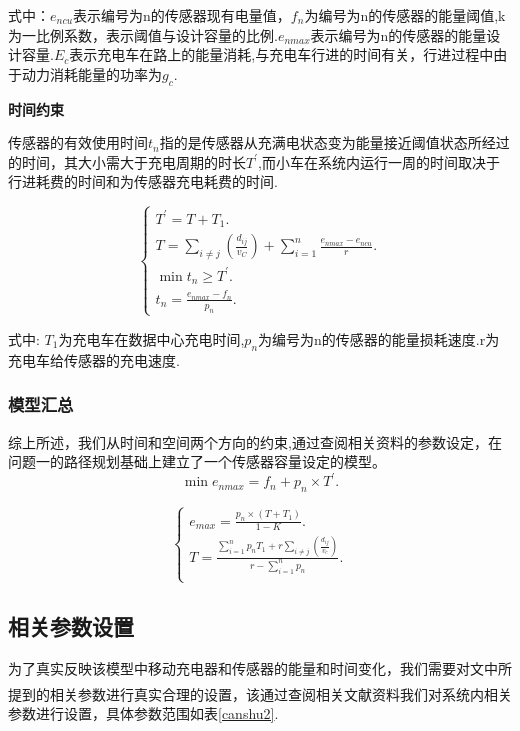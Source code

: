 \documentclass{whutmod}
\newcommand{\upcite}[1]{\textsuperscript{\textsuperscript{\cite{#1}}}}
\begin{document}
式中：$e_{ncu}$表示编号为n的传感器现有电量值，$f_{n}$为编号为n的传感器的能量阈值,k为一比例系数，表示阈值与设计容量的比例.$e_{nmax}$表示编号为n的传感器的能量设计容量.$E_{c}$表示充电车在路上的能量消耗,与充电车行进的时间有关，行进过程中由于动力消耗能量的功率为$g_{c}$.

\textbf{时间约束}

传感器的有效使用时间$t_{n}$指的是传感器从充满电状态变为能量接近阈值状态所经过的时间，其大小需大于充电周期的时长$T^{\prime}$,而小车在系统内运行一周的时间取决于行进耗费的时间和为传感器充电耗费的时间.

\begin{equation}\left\{\begin{array}{l}
		T^{\prime}=T+T_{1} .\\
		T=\sum_{i\neq j}(\frac{d_{ij}}{v_{C}})+\sum_{i=1}^{n} \frac{e_{nmax}-e_{ncu}}{r}. \\	
		\min {t_{n}} \ge T^{\prime}.\\
		t_{n}=\frac{e_{nmax}-f_{n}}{p_{n}}.
	\end{array}\right.
\end{equation}

式中: $T_{1}$为充电车在数据中心充电时间,$p_{n}$为编号为n的传感器的能量损耗速度.\qquad r为充电车给传感器的充电速度.

\subsubsection{模型汇总}
综上所述，我们从时间和空间两个方向的约束,通过查阅相关资料的参数设定，在问题一的路径规划基础上建立了一个传感器容量设定的模型。
\begin{equation}
	\min e_{nmax}=f_{n}+p_{n}\times T^{\prime}.
\end{equation}

\begin{equation}\left\{\begin{array}{l}
		e_{max}=\frac {p_{n}\times (T+T_{1})}{1-K}.\\	
		T=\frac{\sum_{i=1}^{n}p_{n}T_{1}+r\sum_{i\neq j}(\frac{d_{ij}}{v_{c}})} {r-\sum_{i=1}^{n}p_{n}}.\\
		
	\end{array}\right.
\end{equation}

\subsection{相关参数设置}
为了真实反映该模型中移动充电器和传感器的能量和时间变化，我们需要对文中所提到的相关参数进行真实合理的设置，该通过查阅相关文献资料\upcite{bib:one}\upcite{bib:two}\upcite{bib:three}我们对系统内相关参数进行设置，具体参数范围如表\ref{canshu2}.
\end{document}
